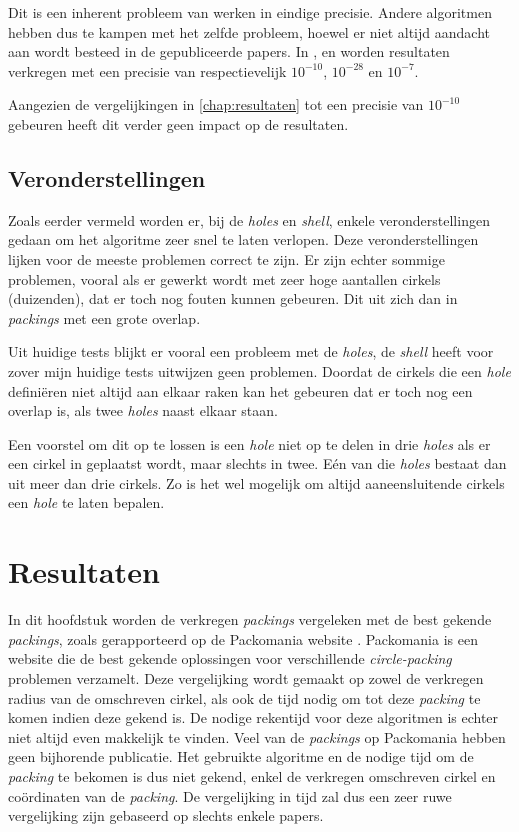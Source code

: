 \documentclass[12pt,a4paper,oneside]{book}
\begin{document}
{Dit is een inherent probleem van werken in eindige precisie.
Andere algoritmen hebben dus te kampen met het zelfde probleem, hoewel er niet altijd aandacht aan wordt besteed in de gepubliceerde papers.
In \cite{akeb2006basic}, \cite{ye2013iterated} en \cite{m2013packing} worden resultaten verkregen met een precisie van respectievelijk $10^{-10}$, $10^{-28}$ en $10^{-7}$.


Aangezien de vergelijkingen in \autoref{chap:resultaten} tot een precisie van $10^{-10}$ gebeuren heeft dit verder geen impact op de resultaten.

\section{Veronderstellingen}

Zoals eerder vermeld worden er, bij de \textit{holes} en \textit{shell}, enkele veronderstellingen gedaan om het algoritme zeer snel te laten verlopen.
Deze veronderstellingen lijken voor de meeste problemen correct te zijn.
Er zijn echter sommige problemen, vooral als er gewerkt wordt met zeer hoge aantallen cirkels (duizenden), dat er toch nog fouten kunnen gebeuren.
Dit uit zich dan in \textit{packings} met een grote overlap.

Uit huidige tests blijkt er vooral een probleem met de \textit{holes}, de \textit{shell} heeft voor zover mijn huidige tests uitwijzen geen problemen.
Doordat de cirkels die een \textit{hole} definiëren niet altijd aan elkaar raken kan het gebeuren dat er toch nog een overlap is, als twee \textit{holes} naast elkaar staan.

Een voorstel om dit op te lossen is een \textit{hole} niet op te delen in drie \textit{holes} als er een cirkel in geplaatst wordt, maar slechts in twee.
Eén van die \textit{holes} bestaat dan uit meer dan drie cirkels.
Zo is het wel mogelijk om altijd aaneensluitende cirkels een \textit{hole} te laten bepalen.

\chapter{Resultaten} \label{chap:resultaten}

In dit hoofdstuk worden de verkregen \textit{packings} vergeleken met de best gekende \textit{packings}, zoals gerapporteerd op de Packomania website \cite{packomania}.
Packomania is een website die de best gekende oplossingen voor verschillende \textit{circle-packing} problemen verzamelt.
Deze vergelijking wordt gemaakt op zowel de verkregen radius van de omschreven cirkel, als ook de tijd nodig om tot deze \textit{packing} te komen indien deze gekend is.
De nodige rekentijd voor deze algoritmen is echter niet altijd even makkelijk te vinden.
Veel van de \textit{packings} op Packomania hebben geen bijhorende publicatie.
Het gebruikte algoritme en de nodige tijd om de \textit{packing} te bekomen is dus niet gekend, enkel de verkregen omschreven cirkel en coördinaten van de \textit{packing}.
De vergelijking in tijd zal dus een zeer ruwe vergelijking zijn gebaseerd op slechts enkele papers.

}
\end{document}
